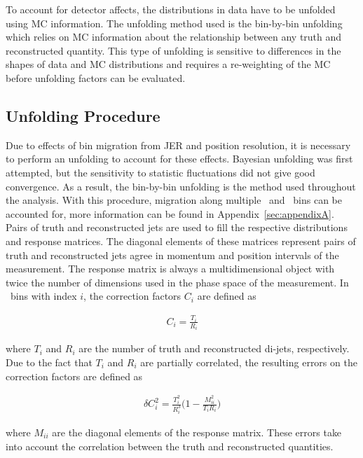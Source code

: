 To account for detector affects, the distributions in data have to be unfolded using MC information. The unfolding method used is the bin-by-bin unfolding which relies on MC information about the relationship between any truth and reconstructed quantity. This type of unfolding is sensitive to differences in the shapes of data and MC distributions and requires a re-weighting of the MC before unfolding factors can be evaluated. 

\subsection{Unfolding Procedure}
\label{sec:unfolding}
Due to effects of bin migration from JER and position resolution, it is necessary to perform an unfolding to account for these effects. Bayesian unfolding was first attempted, but the sensitivity to statistic fluctuations did not give good convergence. As a result, the bin-by-bin unfolding is the method used throughout the analysis. With this procedure, migration along multiple \ystar\ and \pT\ bins can be accounted for, more information can be found in Appendix~\ref{sec:appendixA}. Pairs of truth and reconstructed jets are used to fill the respective distributions and response matrices. The diagonal elements of these matrices represent pairs of truth and reconstructed jets agree in momentum and position intervals of the measurement. The response matrix is always a multidimensional object with twice the number of dimensions used in the phase space of the measurement. In \Dphi\ bins with index $i$, the correction factors $C_{i}$ are defined as  

\begin{eqnarray}
C_{i} = \frac{T_{i}}{R_{i}}
\label{eqn:factors}
\end{eqnarray}

where $T_{i}$ and $R_{i}$ are the number of truth and reconstructed di-jets, respectively.  Due to the fact that $T_{i}$ and $R_{i}$ are partially correlated, the resulting errors on the correction factors are defined as

\begin{eqnarray}
\delta C_{i}^{2} = \frac{T_{i}^{2}}{R_{i}^{3}}\bigg(1-\frac{M_{ii}^{2}}{T_{i}R_{i}}\bigg)
\label{eqn:factorserrors}
\end{eqnarray}

where $M_{ii}$ are the diagonal elements of the response matrix. These errors take into account the correlation between the truth and reconstructed quantities.

